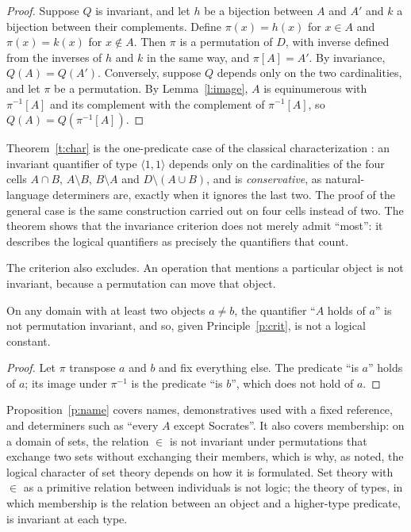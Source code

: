 \documentclass{situationist-preprint}
\begin{document}
\begin{proof}
Suppose $Q$ is invariant, and let $h$ be a bijection between $A$ and $A'$ and $k$ a bijection between their complements. Define $\pi(x) = h(x)$ for $x \in A$ and $\pi(x) = k(x)$ for $x \notin A$. Then $\pi$ is a permutation of $D$, with inverse defined from the inverses of $h$ and $k$ in the same way, and $\pi[A] = A'$. By invariance, $Q(A) = Q(A')$. Conversely, suppose $Q$ depends only on the two cardinalities, and let $\pi$ be a permutation. By Lemma~\ref{l:image}, $A$ is equinumerous with $\pi^{-1}[A]$ and its complement with the complement of $\pi^{-1}[A]$, so $Q(A) = Q(\pi^{-1}[A])$.
\end{proof}

Theorem~\ref{t:char} is the one-predicate case of the classical characterization \citep{Tarski1986,vanBenthem1986}: an invariant quantifier of type $\langle 1, 1\rangle$ depends only on the cardinalities of the four cells $A \cap B$, $A \setminus B$, $B \setminus A$ and $D \setminus (A \cup B)$, and is \emph{conservative}, as natural-language determiners are, exactly when it ignores the last two. The proof of the general case is the same construction carried out on four cells instead of two. The theorem shows that the invariance criterion does not merely admit \enquote{most}: it describes the logical quantifiers as precisely the quantifiers that count.

The criterion also excludes. An operation that mentions a particular object is not invariant, because a permutation can move that object.

\begin{proposition}\label{p:name}
On any domain with at least two objects $a \neq b$, the quantifier \enquote{$A$ holds of $a$} is not permutation invariant, and so, given Principle~\ref{p:crit}, is not a logical constant.
\end{proposition}

\begin{proof}
Let $\pi$ transpose $a$ and $b$ and fix everything else. The predicate \enquote{is $a$} holds of $a$; its image under $\pi^{-1}$ is the predicate \enquote{is $b$}, which does not hold of $a$.
\end{proof}

Proposition~\ref{p:name} covers names, demonstratives used with a fixed reference, and determiners such as \enquote{every $A$ except Socrates}. It also covers membership: on a domain of sets, the relation $\in$ is not invariant under permutations that exchange two sets without exchanging their members, which is why, as \citet{Tarski1986} noted, the logical character of set theory depends on how it is formulated. Set theory with $\in$ as a primitive relation between individuals is not logic; the theory of types, in which membership is the relation between an object and a higher-type predicate, is invariant at each type.
\end{document}
